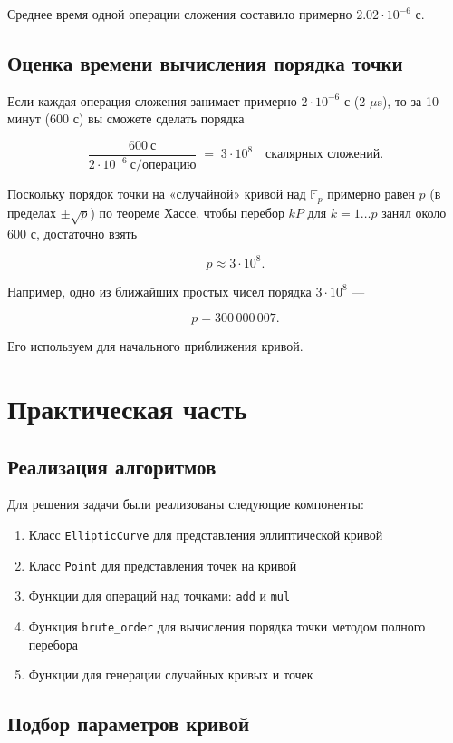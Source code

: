 \documentclass[a4paper,12pt]{article}
\begin{document}
Среднее время одной операции сложения составило примерно $2.02 \cdot 10^{-6}$ с.

\subsection{Оценка времени вычисления порядка точки}
Если каждая операция сложения занимает примерно $2\cdot10^{-6}$ с (2 $\mu$s), то за 10 минут (600 с) вы сможете сделать порядка

$$
\frac{600\ \text{с}}{2\cdot10^{-6}\ \text{с/операцию}}
\;=\;3\cdot10^8
\quad\text{скалярных сложений.}
$$

Поскольку порядок точки на «случайной» кривой над $\mathbb{F}_p$ примерно равен $p$ (в пределах $\pm\sqrt p$) по теореме Хассе, чтобы перебор $kP$ для $k=1\ldots p$ занял около 600 с, достаточно взять

$$
p\approx3\cdot10^8.
$$

Например, одно из ближайших простых чисел порядка $3\cdot10^8$ —

$$
\boxed{p = 300\,000\,007.}
$$

Его используем для начального приближения кривой.

\section{Практическая часть}

\subsection{Реализация алгоритмов}

Для решения задачи были реализованы следующие компоненты:

\begin{enumerate}
    \item Класс \texttt{EllipticCurve} для представления эллиптической кривой
    \item Класс \texttt{Point} для представления точек на кривой
    \item Функции для операций над точками: \texttt{add} и \texttt{mul}
    \item Функция \texttt{brute\_order} для вычисления порядка точки методом полного перебора
    \item Функции для генерации случайных кривых и точек
\end{enumerate}

\subsection{Подбор параметров кривой}
\end{document}
